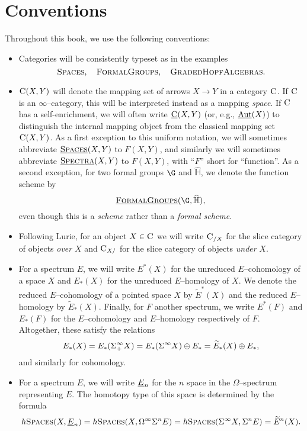 
\section{Conventions}

Throughout this book, we use the following conventions:

\begin{itemize}
\item Categories will be consistently typeset as in the examples \[\normalfont\textsc{Spaces}, \quad \normalfont\textsc{FormalGroups}, \quad \normalfont\textsc{GradedHopfAlgebras}.\]
\item $\normalfont\textsc{C}(X, Y)$ will denote the mapping set of arrows $X \to Y$ in a category $\normalfont\textsc{C}$.  If $\normalfont\textsc{C}$ is an $\infty$--category, this will be interpreted instead as a mapping \emph{space}.  If $\normalfont\textsc{C}$ has a self-enrichment, we will often write $\underline{\normalfont\textsc{C}}(X, Y)$ (or, e.g., $\operatorname{\underline{\smash{\operatorname{Aut}}}}(X)$) to distinguish the internal mapping object from the classical mapping set $\normalfont\textsc{C}(X, Y)$.  As a first exception to this uniform notation, we will sometimes abbreviate $\underline{\normalfont\textsc{Spaces}}(X, Y)$ to $F(X, Y)$, and similarly we will sometimes abbreviate $\underline{\normalfont\textsc{Spectra}}(X, Y)$ to $F(X, Y)$, with ``$F$'' short for ``function''.  As a second exception, for two formal groups $\G$ and $\widehat{\mathbb H}$, we denote the function scheme by \[\InternalHom{FormalGroups}(\G, \widehat{\mathbb H}),\] even though this is a \emph{scheme} rather than a \emph{formal scheme}.
\item Following Lurie, for an object $X \in \normalfont\textsc{C}$ we will write $\normalfont\textsc{C}_{/X}$ for the slice category of objects \emph{over} $X$ and $\normalfont\textsc{C}_{X/}$ for the slice category of objects \emph{under} $X$.
\item For a spectrum $E$, we will write $E^*(X)$ for the unreduced $E$--cohomology of a space $X$ and $E_*(X)$ for the unreduced $E$--homology of $X$.  We denote the reduced $E$--cohomology of a pointed space $X$ by $\widetilde E^*(X)$ and the reduced $E$--homology by $\widetilde E_*(X)$.  Finally, for $F$ another spectrum, we write $E^*(F)$ and $E_*(F)$ for the $E$--cohomology and $E$--homology respectively of $F$.  Altogether, these satisfy the relations \[E_*(X) = E_*(\Sigma^\infty_+ X) = E_*(\Sigma^\infty X) \oplus E_* = \widetilde E_*(X) \oplus E_*,\] and similarly for cohomology.
\item For a spectrum $E$, we will write $\underline{\smash{E}}_{n}$ for the $n${\th} space in the $\Omega$--spectrum representing $E$.  The homotopy type of this space is determined by the formula \[h\normalfont\textsc{Spaces}(X, \underline{\smash{E}}_{n}) = h\normalfont\textsc{Spaces}(X, \Omega^\infty \Sigma^n E) = h\normalfont\textsc{Spaces}(\Sigma^\infty X, \Sigma^n E) = \widetilde E^n(X).\]

\end{itemize}
